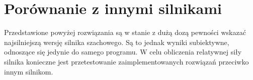 \section {Porównanie z innymi silnikami}
\label {sec: porownianie-z-silnikami}

Przedstawione powyżej rozwiązania są w stanie z dużą dozą pewności wskazać najsilniejszą wersję silnika szachowego.
Są to jednak wyniki subiektywne, odnoszące się jedynie do samego programu.
W celu obliczenia relatywnej siły silnika konieczne jest przetestowanie zaimplementowanych rozwiązań przeciwko innym silnikom.



